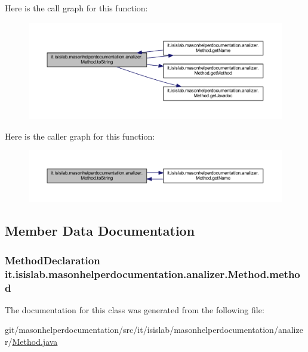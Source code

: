 Here is the call graph for this function\-:
\nopagebreak
\begin{figure}[H]
\begin{center}
\leavevmode
\includegraphics[width=350pt]{classit_1_1isislab_1_1masonhelperdocumentation_1_1analizer_1_1_method_abd783b39c400e8db1f5e0f08c00c8e5a_cgraph}
\end{center}
\end{figure}




Here is the caller graph for this function\-:
\nopagebreak
\begin{figure}[H]
\begin{center}
\leavevmode
\includegraphics[width=350pt]{classit_1_1isislab_1_1masonhelperdocumentation_1_1analizer_1_1_method_abd783b39c400e8db1f5e0f08c00c8e5a_icgraph}
\end{center}
\end{figure}




\subsection{Member Data Documentation}
\hypertarget{classit_1_1isislab_1_1masonhelperdocumentation_1_1analizer_1_1_method_a86b6aa02f4993d83ee78e19f1f211130}{
\subsubsection[{method}]{\setlength{\rightskip}{0pt plus 5cm}Method\-Declaration it.\-isislab.\-masonhelperdocumentation.\-analizer.\-Method.\-method\hspace{0.3cm}{\ttfamily [private]}}}\label{classit_1_1isislab_1_1masonhelperdocumentation_1_1analizer_1_1_method_a86b6aa02f4993d83ee78e19f1f211130}


The documentation for this class was generated from the following file\-:\begin{DoxyCompactItemize}
\item 
git/masonhelperdocumentation/src/it/isislab/masonhelperdocumentation/analizer/\hyperlink{_method_8java}{Method.\-java}\end{DoxyCompactItemize}
